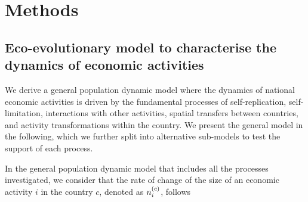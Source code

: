 
\section{Methods}\label{sec:methods}

\subsection{Eco-evolutionary model to characterise the dynamics of economic activities}

We derive a general population dynamic model where the dynamics of national economic activities is driven by the fundamental processes of self-replication, self-limitation, interactions with other activities, spatial transfers between countries, and activity transformations within the country. We present the general model in the following, which we further split into alternative sub-models to test the support of each process.

In the general population dynamic model that includes all the processes investigated, we consider that the rate of change of the size of an economic activity $i$ in the country $c$, denoted as $n_i^{(c)} $, follows

